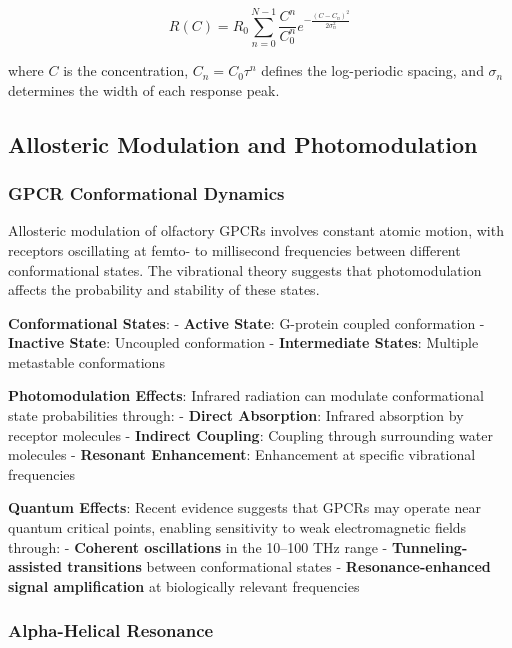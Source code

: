 \documentclass[
  13pt,
  a4paperpaper,
  12pt]{article}
\begin{document}
\begin{equation}
R(C) = R_0 \sum_{n=0}^{N-1} \frac{C^n}{C_0^n} e^{-\frac{(C - C_n)^2}{2\sigma_n^2}}
\label{eq:log_periodic_response_empirical}
\end{equation}

where \(C\) is the concentration, \(C_n = C_0 \tau^n\) defines the
log-periodic spacing, and \(\sigma_n\) determines the width of each
response peak.

\subsection{Allosteric Modulation and
Photomodulation}\label{allosteric-modulation-and-photomodulation}

\subsubsection{GPCR Conformational
Dynamics}\label{gpcr-conformational-dynamics}

Allosteric modulation of olfactory GPCRs involves constant atomic
motion, with receptors oscillating at femto- to millisecond frequencies
between different conformational states. The vibrational theory suggests
that photomodulation affects the probability and stability of these
states.

\textbf{Conformational States}: - \textbf{Active State}: G-protein
coupled conformation - \textbf{Inactive State}: Uncoupled conformation -
\textbf{Intermediate States}: Multiple metastable conformations

\textbf{Photomodulation Effects}: Infrared radiation can modulate
conformational state probabilities through: - \textbf{Direct
Absorption}: Infrared absorption by receptor molecules -
\textbf{Indirect Coupling}: Coupling through surrounding water molecules
- \textbf{Resonant Enhancement}: Enhancement at specific vibrational
frequencies

\textbf{Quantum Effects}: Recent evidence suggests that GPCRs may
operate near quantum critical points, enabling sensitivity to weak
electromagnetic fields through: - \textbf{Coherent oscillations} in the
10--100 THz range - \textbf{Tunneling-assisted transitions} between
conformational states - \textbf{Resonance-enhanced signal amplification}
at biologically relevant frequencies

\subsubsection{Alpha-Helical Resonance}\label{alpha-helical-resonance}
\end{document}
